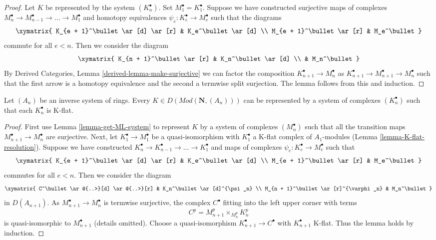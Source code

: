 \begin{proof}
Let $K$ be represented by the system $(K_n^\bullet)$. Set
$M_1^\bullet = K_1^\bullet$. Suppose we have constructed surjective maps
of complexes $M_n^\bullet \to M_{n - 1}^\bullet \to \ldots \to M_1^\bullet$
and homotopy equivalences $\psi_e : K_e^\bullet \to M_e^\bullet$ such that
the diagrams
$$
\xymatrix{
K_{e + 1}^\bullet \ar[d] \ar[r] & K_e^\bullet \ar[d] \\
M_{e + 1}^\bullet \ar[r] & M_e^\bullet
}
$$
commute for all $e < n$. Then we consider the diagram
$$
\xymatrix{
K_{n + 1}^\bullet \ar[r] & K_n^\bullet \ar[d] \\
& M_n^\bullet
}
$$
By Derived Categories, Lemma \ref{derived-lemma-make-surjective}
we can factor the composition $K_{n + 1}^\bullet \to M_n^\bullet$ as
$K_{n + 1}^\bullet \to M_{n + 1}^\bullet \to M_n^\bullet$
such that the first arrow is a homotopy equivalence and the
second a termwise split surjection. The lemma follows
from this and induction.
\end{proof}

\begin{lemma}
\label{lemma-get-K-flat-system}
Let $(A_n)$ be an inverse system of rings. Every
$K \in D(\textit{Mod}(\mathbf{N}, (A_n)))$
can be represented by a system of complexes $(K_n^\bullet)$
such that each $K_n^\bullet$ is K-flat.
\end{lemma}

\begin{proof}
First use Lemma \ref{lemma-get-ML-system} to represent $K$ by a
system of complexes $(M_n^\bullet)$ such that all the transition maps
$M_{n + 1}^\bullet \to M_n^\bullet$ are surjective.
Next, let $K_1^\bullet \to M_1^\bullet$ be a quasi-isomorphism
with $K_1^\bullet$ a K-flat complex of $A_1$-modules
(Lemma \ref{lemma-K-flat-resolution}).
Suppose we have constructed
$K_n^\bullet \to K_{n - 1}^\bullet \to \ldots \to K_1^\bullet$
and maps of complexes $\psi_e : K_e^\bullet \to M_e^\bullet$ such that
$$
\xymatrix{
K_{e + 1}^\bullet \ar[d] \ar[r] & K_e^\bullet \ar[d] \\
M_{e + 1}^\bullet \ar[r] & M_e^\bullet
}
$$
commutes for all $e < n$. Then we consider the diagram
$$
\xymatrix{
C^\bullet \ar@{..>}[d] \ar@{..>}[r] & K_n^\bullet \ar[d]^{\psi_n} \\
M_{n + 1}^\bullet \ar[r]^{\varphi_n} & M_n^\bullet
}
$$
in $D(A_{n + 1})$. As $M_{n + 1}^\bullet \to M_n^\bullet$ is
termwise surjective, the complex $C^\bullet$ fitting into the left
upper corner with terms
$$
C^p = M_{n + 1}^p \times_{M_n^p} K_n^p
$$
is quasi-isomorphic to $M_{n + 1}^\bullet$ (details omitted).
Choose a quasi-isomorphism $K_{n + 1}^\bullet \to C^\bullet$
with $K_{n +1}^\bullet$ K-flat.
Thus the lemma holds by induction.
\end{proof}

